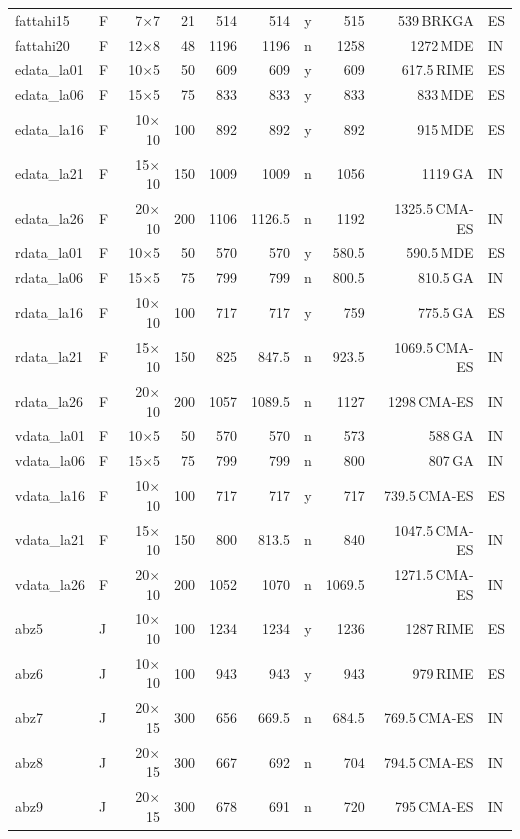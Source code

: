 {\begin{longtable}{llrrrrcrrl}
fattahi15 & F & 7$\times$7 & 21 & 514 & 514 & y & 515 & 539\,BRKGA & ES \\
fattahi20 & F & 12$\times$8 & 48 & 1196 & 1196 & n & 1258 & 1272\,MDE & IN \\
edata\_la01 & F & 10$\times$5 & 50 & 609 & 609 & y & 609 & 617.5\,RIME & ES \\
edata\_la06 & F & 15$\times$5 & 75 & 833 & 833 & y & 833 & 833\,MDE & ES \\
edata\_la16 & F & 10$\times$10 & 100 & 892 & 892 & y & 892 & 915\,MDE & ES \\
edata\_la21 & F & 15$\times$10 & 150 & 1009 & 1009 & n & 1056 & 1119\,GA & IN \\
edata\_la26 & F & 20$\times$10 & 200 & 1106 & 1126.5 & n & 1192 & 1325.5\,CMA-ES & IN \\
rdata\_la01 & F & 10$\times$5 & 50 & 570 & 570 & y & 580.5 & 590.5\,MDE & ES \\
rdata\_la06 & F & 15$\times$5 & 75 & 799 & 799 & n & 800.5 & 810.5\,GA & IN \\
rdata\_la16 & F & 10$\times$10 & 100 & 717 & 717 & y & 759 & 775.5\,GA & ES \\
rdata\_la21 & F & 15$\times$10 & 150 & 825 & 847.5 & n & 923.5 & 1069.5\,CMA-ES & IN \\
rdata\_la26 & F & 20$\times$10 & 200 & 1057 & 1089.5 & n & 1127 & 1298\,CMA-ES & IN \\
vdata\_la01 & F & 10$\times$5 & 50 & 570 & 570 & n & 573 & 588\,GA & IN \\
vdata\_la06 & F & 15$\times$5 & 75 & 799 & 799 & n & 800 & 807\,GA & IN \\
vdata\_la16 & F & 10$\times$10 & 100 & 717 & 717 & y & 717 & 739.5\,CMA-ES & ES \\
vdata\_la21 & F & 15$\times$10 & 150 & 800 & 813.5 & n & 840 & 1047.5\,CMA-ES & IN \\
vdata\_la26 & F & 20$\times$10 & 200 & 1052 & 1070 & n & 1069.5 & 1271.5\,CMA-ES & IN \\
abz5 & J & 10$\times$10 & 100 & 1234 & 1234 & y & 1236 & 1287\,RIME & ES \\
abz6 & J & 10$\times$10 & 100 & 943 & 943 & y & 943 & 979\,RIME & ES \\
abz7 & J & 20$\times$15 & 300 & 656 & 669.5 & n & 684.5 & 769.5\,CMA-ES & IN \\
abz8 & J & 20$\times$15 & 300 & 667 & 692 & n & 704 & 794.5\,CMA-ES & IN \\
abz9 & J & 20$\times$15 & 300 & 678 & 691 & n & 720 & 795\,CMA-ES & IN \\

\end{longtable}}
